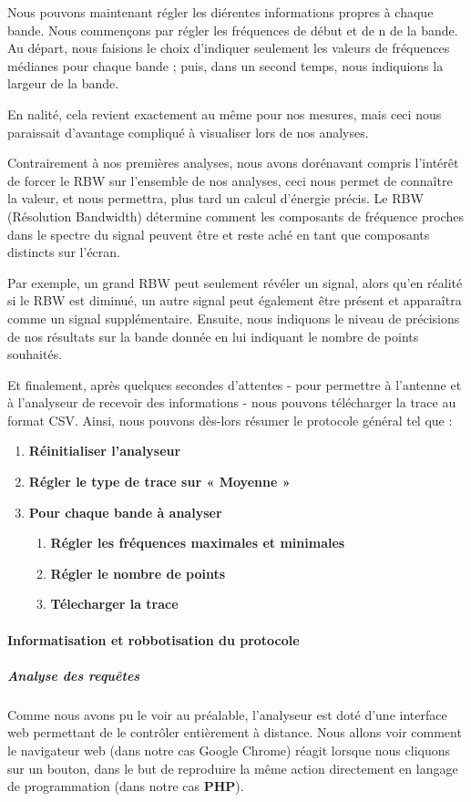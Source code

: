 Nous pouvons maintenant régler les diérentes informations propres à chaque bande. Nous commençons par régler les
    fréquences de début et de n de la bande. Au départ, nous faisions le choix d'indiquer seulement les valeurs de fréquences
    médianes pour chaque bande ; puis, dans un second temps, nous indiquions la largeur de la bande.

En nalité, cela revient exactement au même pour nos mesures,
    mais ceci nous paraissait d'avantage compliqué à visualiser lors de nos analyses.


Contrairement à nos premières analyses, nous avons dorénavant compris l'intérêt de forcer le RBW sur l'ensemble de
nos analyses, ceci nous permet de connaître la valeur, et nous permettra, plus tard un calcul d'énergie précis.
Le  RBW (Résolution Bandwidth) détermine comment les composants de fréquence proches dans le spectre
du signal peuvent être et reste aché en tant que composants distincts sur l'écran.

Par exemple, un grand RBW peut seulement révéler un signal, alors qu'en réalité si le RBW est diminué,
    un autre signal peut également être présent et apparaîtra comme un signal supplémentaire.
Ensuite, nous indiquons le niveau de précisions de nos résultats sur la bande donnée en lui indiquant le
    nombre de points souhaités.

Et finalement, après quelques secondes d'attentes - pour permettre à l'antenne et à l'analyseur
    de recevoir des informations - nous pouvons télécharger la trace au format CSV.
Ainsi, nous pouvons dès-lors résumer le protocole général tel que :

\begin{enumerate}
      \item \textbf{Réinitialiser l'analyseur}
      \item \textbf{Régler le type de trace sur « Moyenne »}
      \item \textbf{Pour chaque bande à analyser}
      \begin{enumerate}
          \item \textbf{Régler les fréquences maximales et minimales}
          \item \textbf{Régler le nombre de points}
          \item \textbf{Télecharger la trace}
      \end{enumerate}
\end{enumerate}


\paragraph{Informatisation et robbotisation du protocole}
    \subparagraph{Analyse des requêtes}
        Comme nous avons pu le voir au préalable, l'analyseur est doté d'une interface web
            permettant de le contrôler entièrement à distance. Nous allons voir comment le navigateur web (dans notre cas Google
            Chrome) réagit lorsque nous cliquons sur un bouton, dans le but de reproduire la même action directement en langage de
            programmation (dans notre cas \textbf{PHP}).

